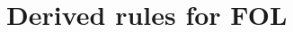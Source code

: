 \begin{minipage}{\textwidth} %
\section{Derived rules for FOL}

\begin{multicols}{2}
\begin{fitchproof}

\\	
\end{fitchproof}
\begin{fitchproof}

\\	
\end{fitchproof}
\end{multicols}
\end{minipage}
